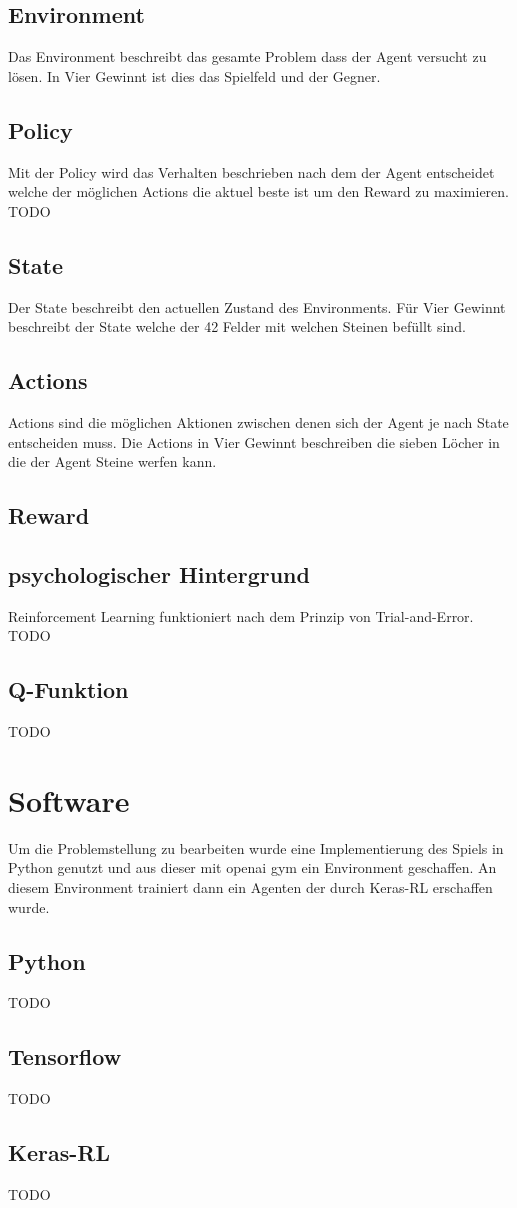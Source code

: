\subsection{Environment}
Das Environment beschreibt das gesamte Problem dass der Agent versucht zu lösen.
In Vier Gewinnt ist dies das Spielfeld und der Gegner. 

\subsection{Policy}
Mit der Policy wird das Verhalten beschrieben nach dem der Agent entscheidet welche der möglichen Actions die aktuel beste ist um den Reward zu maximieren.\\
TODO %

\subsection{State}
Der State beschreibt den actuellen Zustand des Environments.
Für Vier Gewinnt beschreibt der State welche der 42 Felder mit welchen Steinen befüllt sind. 

\subsection{Actions}
Actions sind die möglichen Aktionen zwischen denen sich der Agent je nach State entscheiden muss.
Die Actions in Vier Gewinnt beschreiben die sieben Löcher in die der Agent Steine werfen kann.

\subsection{Reward}

\subsection{psychologischer Hintergrund}
Reinforcement Learning funktioniert nach dem Prinzip von Trial-and-Error.\\
TODO %

\subsection{Q-Funktion}
TODO %


\section{Software}
Um die Problemstellung zu bearbeiten wurde eine Implementierung des Spiels in Python genutzt und aus dieser mit openai gym ein Environment geschaffen. An diesem Environment trainiert dann ein Agenten der durch Keras-RL erschaffen wurde.

\subsection{Python}
TODO
\subsection{Tensorflow}
TODO
\subsection{Keras-RL}
TODO